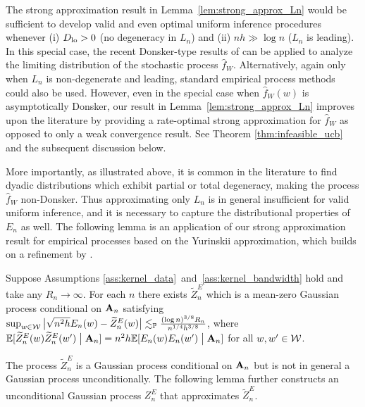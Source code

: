 The strong approximation result in Lemma~\ref{lem:strong_approx_Ln} would be
sufficient to develop valid and even optimal
uniform inference procedures whenever
(i) $D_{\textup{lo}} > 0$ (no degeneracy in $L_n$) and
(ii) $n h \gg \log n$ ($L_n$ is leading).
In this special case, the recent Donsker-type results of
\citet{davezies2021exchangeable}
can be applied to analyze the limiting distribution
of the stochastic process $\widehat{f}_W$.
Alternatively,
again only when $L_n$ is non-degenerate and leading,
standard empirical process methods could also be used.
However, even in the special case when $\widehat{f}_W(w)$ is asymptotically
Donsker, our result in Lemma~\ref{lem:strong_approx_Ln}
improves upon the literature by providing a rate-optimal strong approximation
for $\widehat{f}_W$ as opposed to only a weak convergence result.
See Theorem \ref{thm:infeasible_ucb} and the subsequent
discussion below.

More importantly, as illustrated above,
it is common in the literature to find dyadic
distributions which exhibit partial or total degeneracy, making the process
$\widehat{f}_W$ non-Donsker.
Thus approximating only $L_n$ is in general insufficient
for valid uniform inference,
and it is necessary to capture the distributional properties of $E_n$ as well.
The following lemma is an application of
our strong approximation result for
empirical processes based on the Yurinskii approximation,
which builds on a refinement by \citet{belloni2019conditional}.

\begin{lemma}
  \label{lem:conditional_strong_approx_En}

  Suppose Assumptions
  \ref{ass:kernel_data}~and~\ref{ass:kernel_bandwidth} hold
  and take any $R_n \to \infty$.
  For each $n$ there exists
  $\widetilde Z^E_n$
  which is a mean-zero Gaussian process
  conditional on $\mathbf{A}_n$ satisfying
  $\sup_{w \in \mathcal{W}}
  \big| \sqrt{n^2h} E_n(w) - \widetilde Z_n^E(w) \big|
  \lesssim_{\mathbb{P}} \frac{(\log n)^{3/8} R_n}{n^{1/4}h^{3/8}}$,
  where $\mathbb{E}[\widetilde Z_n^E(w)\widetilde Z_n^E(w')\bigm\vert \mathbf{A}_n]
  =n^2h\mathbb{E}[E_n(w)E_n(w')\bigm\vert \mathbf{A}_n]$
  for all $w, w' \in \mathcal{W}$.
\end{lemma}

The process $\widetilde Z_n^E$
is a Gaussian process conditional on $\mathbf{A}_n$ but is not in general a
Gaussian process unconditionally.
The following lemma further constructs an unconditional Gaussian process
$Z_n^E$ that approximates $\widetilde Z_n^E$.

